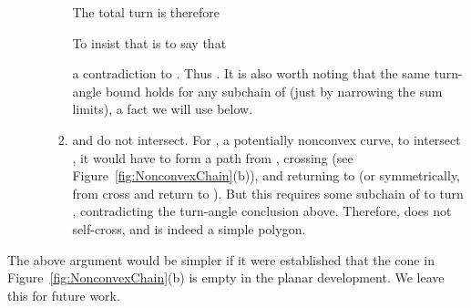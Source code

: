 \pdfoutput=1  \documentclass[]{article}
\newcommand{\ABox}{
\raisebox{3pt}{\framebox[6pt]{\rule{6pt}{0pt}}}
}
\newenvironment{proof}{{\bf Proof:}}{\hfill\ABox}
\newcommand{\figref}[1]{\ref{fig:#1}}
\begin{document}
\begin{proof}
\begin{enumerate}
\begin{enumerate}
\begin{enumerate}
The total turn is therefore


To insist that  is to say that

a contradiction to .
Thus .
It is also worth noting that the same turn-angle bound holds
for any subchain of  (just by narrowing the sum limits),
a fact we will use below.

\item
 and  do not intersect.
For , a potentially nonconvex curve, to intersect ,
it would have to form a path from , crossing 
(see Figure~\figref{NonconvexChain}(b)), and returning to 
(or symmetrically, from  cross  and return to ).
But this requires some subchain of  to turn ,
contradicting the turn-angle conclusion above.
Therefore,  does not self-cross,
and  is indeed a simple polygon.
\end{enumerate}

\end{enumerate}
\end{enumerate}
\end{proof}

\noindent
The above argument would be simpler if it were established that
the cone  in  Figure~\figref{NonconvexChain}(b)
is empty in the planar development.
We leave this for future work.
\end{document}

